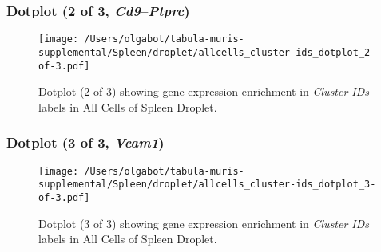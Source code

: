 \clearpage

\subsubsection{Dotplot (2 of 3, \emph{Cd9}--\emph{Ptprc})}
\begin{figure}[h]
\centering
\texttt{[image: /Users/olgabot/tabula-muris-supplemental/Spleen/droplet/allcells\_cluster-ids\_dotplot\_2-of-3.pdf]}

\caption{ Dotplot (2 of 3)  showing gene expression enrichment in \emph{Cluster IDs} labels in All Cells of Spleen Droplet. }
\end{figure}


\clearpage

\subsubsection{Dotplot (3 of 3, \emph{Vcam1})}
\begin{figure}[h]
\centering
\texttt{[image: /Users/olgabot/tabula-muris-supplemental/Spleen/droplet/allcells\_cluster-ids\_dotplot\_3-of-3.pdf]}

\caption{ Dotplot (3 of 3)  showing gene expression enrichment in \emph{Cluster IDs} labels in All Cells of Spleen Droplet. }
\end{figure}

